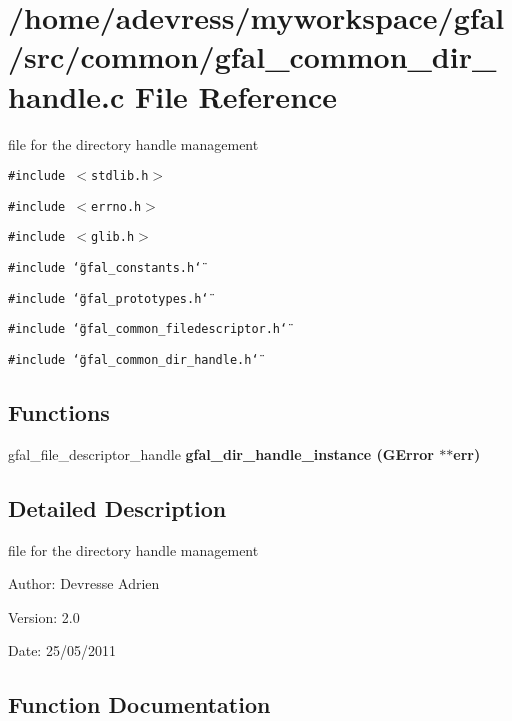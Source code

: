 \section{/home/adevress/myworkspace/gfal/src/common/gfal\_\-common\_\-dir\_\-handle.c File Reference}
\label{gfal__common__dir__handle_8c}
file for the directory handle management 

{\tt \#include $<$stdlib.h$>$}\par
{\tt \#include $<$errno.h$>$}\par
{\tt \#include $<$glib.h$>$}\par
{\tt \#include \char`\"{}gfal\_\-constants.h\char`\"{}}\par
{\tt \#include \char`\"{}gfal\_\-prototypes.h\char`\"{}}\par
{\tt \#include \char`\"{}gfal\_\-common\_\-filedescriptor.h\char`\"{}}\par
{\tt \#include \char`\"{}gfal\_\-common\_\-dir\_\-handle.h\char`\"{}}\par
\subsection*{Functions}
\begin{CompactItemize}
\item 
gfal\_\-file\_\-descriptor\_\-handle \bf{gfal\_\-dir\_\-handle\_\-instance} (GError $\ast$$\ast$err)
\end{CompactItemize}


\subsection{Detailed Description}
file for the directory handle management 

\begin{Desc}
\item[Author:]Devresse Adrien \end{Desc}
\begin{Desc}
\item[Version:]2.0 \end{Desc}
\begin{Desc}
\item[Date:]25/05/2011 \end{Desc}


\subsection{Function Documentation}
